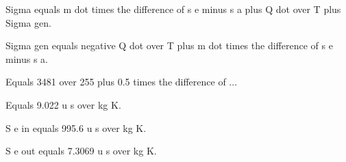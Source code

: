 Sigma equals m dot times the difference of s e minus s a plus Q dot over T plus Sigma gen.  

Sigma gen equals negative Q dot over T plus m dot times the difference of s e minus s a.  

Equals 3481 over 255 plus 0.5 times the difference of ...  

Equals 9.022 u s over kg K.  

S e in equals 995.6 u s over kg K.  

S e out equals 7.3069 u s over kg K.